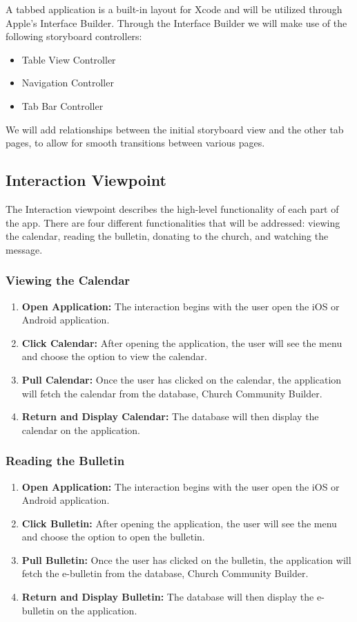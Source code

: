 \documentclass[letterpaper,10pt,draftclsnofoot,onecolumn,titlepage]{IEEEtran}
\begin{document}
			A tabbed application is a built-in layout for Xcode and will be utilized through Apple's Interface Builder.
			Through the Interface Builder we will make use of the following storyboard controllers:
			\begin{itemize}
				\item Table View Controller
				\item Navigation Controller
				\item Tab Bar Controller
			\end{itemize}
			We will add relationships between the initial storyboard view and the other tab pages, to allow for smooth transitions between various pages. 



		\subsection{Interaction Viewpoint}
			The Interaction viewpoint describes the high-level functionality of each part of the app.
			There are four different functionalities that will be addressed: viewing the calendar, reading the bulletin, donating to the church, and watching the message.

			\subsubsection{Viewing the Calendar}
				\begin{enumerate}
					\item \textbf{Open Application:} The interaction begins with the user open the iOS or Android application.
					\item \textbf{Click Calendar:} After opening the application, the user will see the menu and choose the option to view the calendar.
					\item \textbf{Pull Calendar:} Once the user has clicked on the calendar, the application will fetch the calendar from the database, Church Community Builder.
					\item \textbf{Return and Display Calendar:} The database will then display the calendar on the application.
				\end{enumerate}

			\subsubsection{Reading the Bulletin}
				\begin{enumerate}
					\item \textbf{Open Application:} The interaction begins with the user open the iOS or Android application.
					\item \textbf{Click Bulletin:} After opening the application, the user will see the menu and choose the option to open the bulletin.
					\item \textbf{Pull Bulletin:} Once the user has clicked on the bulletin, the application will fetch the e-bulletin from the database, Church Community Builder.
					\item \textbf{Return and Display Bulletin:} The database will then display the e-bulletin on the application.
				\end{enumerate}
\end{document}
